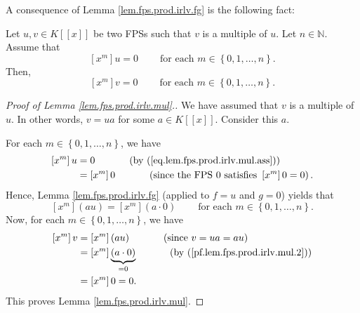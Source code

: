 A consequence of Lemma \ref{lem.fps.prod.irlv.fg} is the following fact:

\begin{lemma}
\label{lem.fps.prod.irlv.mul}Let $u,v\in K\left[  \left[  x\right]  \right]  $
be two FPSs such that $v$ is a multiple of $u$. Let $n\in\mathbb{N}$. Assume
that
\begin{equation}
\left[  x^{m}\right]  u=0\ \ \ \ \ \ \ \ \ \ \text{for each }m\in\left\{
0,1,\ldots,n\right\}  . \label{eq.lem.fps.prod.irlv.mul.ass}%
\end{equation}
Then,
\[
\left[  x^{m}\right]  v=0\ \ \ \ \ \ \ \ \ \ \text{for each }m\in\left\{
0,1,\ldots,n\right\}  .
\]

\end{lemma}

\begin{proof}
[Proof of Lemma \ref{lem.fps.prod.irlv.mul}.]We have assumed that $v$ is a
multiple of $u$. In other words, $v=ua$ for some $a\in K\left[  \left[
x\right]  \right]  $. Consider this $a$.

For each $m\in\left\{  0,1,\ldots,n\right\}  $, we have%
\begin{align*}
\left[  x^{m}\right]  u  &  =0\ \ \ \ \ \ \ \ \ \ \left(  \text{by
(\ref{eq.lem.fps.prod.irlv.mul.ass})}\right) \\
&  =\left[  x^{m}\right]  0\ \ \ \ \ \ \ \ \ \ \left(  \text{since the FPS
}0\text{ satisfies }\left[  x^{m}\right]  0=0\right)  .
\end{align*}
Hence, Lemma \ref{lem.fps.prod.irlv.fg} (applied to $f=u$ and $g=0$) yields
that%
\begin{equation}
\left[  x^{m}\right]  \left(  au\right)  =\left[  x^{m}\right]  \left(
a\cdot0\right)  \ \ \ \ \ \ \ \ \ \ \text{for each }m\in\left\{
0,1,\ldots,n\right\}  . \label{pf.lem.fps.prod.irlv.mul.2}%
\end{equation}
Now, for each $m\in\left\{  0,1,\ldots,n\right\}  $, we have%
\begin{align*}
\left[  x^{m}\right]  v  &  =\left[  x^{m}\right]  \left(  au\right)
\ \ \ \ \ \ \ \ \ \ \left(  \text{since }v=ua=au\right) \\
&  =\left[  x^{m}\right]  \underbrace{\left(  a\cdot0\right)  }_{=0}%
\ \ \ \ \ \ \ \ \ \ \left(  \text{by (\ref{pf.lem.fps.prod.irlv.mul.2}%
)}\right) \\
&  =\left[  x^{m}\right]  0=0.
\end{align*}
This proves Lemma \ref{lem.fps.prod.irlv.mul}.
\end{proof}

